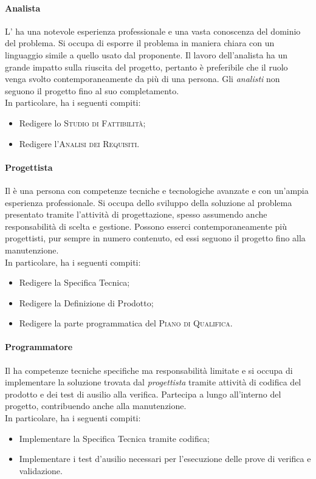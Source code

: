 \paragraph{Analista}

L'\emph{} ha una notevole esperienza professionale e una vasta conoscenza del dominio del problema. 
Si occupa di esporre il problema in maniera chiara con un linguaggio simile a quello usato dal proponente. Il lavoro 
dell'analista ha un grande impatto sulla riuscita del progetto, pertanto è preferibile che il ruolo venga svolto 
contemporaneamente da più di una persona. 
Gli \emph{analisti} non seguono il progetto fino al suo completamento.\\
In particolare, ha i seguenti compiti:
\begin{itemize} 
    \item Redigere lo \textsc{Studio di Fattibilità};
    \item Redigere l'\textsc{Analisi dei Requisiti}.
\end{itemize}

\paragraph{Progettista}

Il \emph{} è una persona con competenze tecniche e tecnologiche avanzate e con un'ampia 
esperienza professionale. Si occupa dello sviluppo della soluzione al problema presentato tramite l'attività di 
progettazione, spesso assumendo anche responsabilità di scelta e gestione. Possono esserci contemporaneamente più 
progettisti, pur sempre in numero contenuto, ed essi seguono il progetto fino alla manutenzione.\\
In particolare, ha i seguenti compiti:
\begin{itemize}
    \item Redigere la Specifica Tecnica;
    \item Redigere la Definizione di Prodotto;
    \item Redigere la parte programmatica del \textsc{Piano di Qualifica}.
\end{itemize}

\paragraph{Programmatore}

Il \emph{} ha competenze tecniche specifiche ma responsabilità limitate e si occupa di 
implementare la soluzione trovata dal \emph{progettista} tramite attività di codifica del prodotto e dei test di 
ausilio alla verifica. Partecipa a lungo all'interno del progetto, contribuendo anche alla manutenzione.\\
In particolare, ha i seguenti compiti:
\begin{itemize}
    \item Implementare la Specifica Tecnica tramite codifica;
    \item Implementare i test d'ausilio necessari per l'esecuzione delle prove di verifica e validazione.
\end{itemize}

